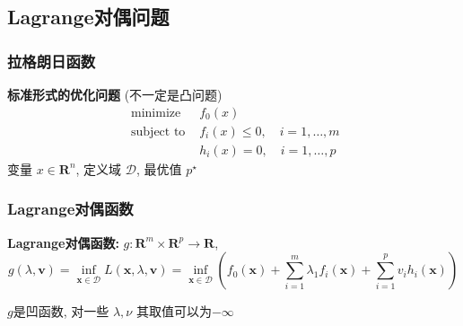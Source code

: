 \documentclass[handout,10pt]{beamer}
\begin{document}
\subsection{Lagrange对偶问题}
\begin{frame}
    \frametitle{拉格朗日函数}
    \textbf{标准形式的优化问题} (不一定是凸问题)
    \begin{equation}
    	\begin{array}{ll}
    	\text{ minimize } & f_{0}(x) \\
    	\text { subject to } & f_{i}(x) \leq 0, \quad i=1, \ldots, m \\
    	& h_{i}(x)=0, \quad i=1, \ldots, p
    	\end{array}
    \end{equation}
    变量 $x \in \mathbf{R}^{n}$, 定义域 $\mathcal{D}$, 最优值 $p^{\star}$\\


\end{frame}
\begin{frame}
     \frametitle{Lagrange对偶函数}
	\textbf{Lagrange对偶函数:} $g : \textbf{R}^m\times\textbf{R}^p\to\mathbf{R}$,
	\begin{equation}
g(\lambda, \boldsymbol{v})=\inf _{\boldsymbol{x} \in \mathcal{D}} L(\boldsymbol{x}, \lambda, \boldsymbol{v})=\inf _{\boldsymbol{x} \in \mathcal{D}}\left(f_0(\boldsymbol{x})+\sum_{i=1}^m \lambda_1 f_i(\boldsymbol{x})+\sum_{i=1}^p v_i h_i(\boldsymbol{x})\right)
	\end{equation}

	$g$是凹函数, 对一些 $\lambda,\nu$ 其取值可以为$-\infty$ 

	

\end{frame}
\end{document}
